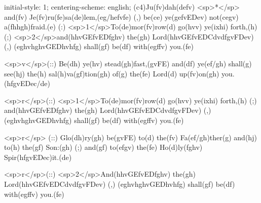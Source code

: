 initial-style: 1;
centering-scheme: english;
(c4)Ju(fv)dah(defv) <sp>*</sp> and(fv) Je(fv)ru(fe)sa(de)lem,(eg/hefvfe) (,) be(ce) ye(gefvEDev) not(cegv) a(fhhgh)fraid.(e) (:) <sp>1</sp>To(de)mor(fv)row(d) go(hvv) ye(ixhi) forth,(h) (;) <sp>2</sp>and(hhvGEfvEDfghv) the(gh) Lord(hhvGEfvEDCdvdfgvFDev) (,) (eghvhghvGEDhvhfg) shall(gf) be(df) with(egffv) you.(fe) 

<sp>v</sp>(::) Be(dh) ye(hv) stead(gh)fast,(gvFE) and(df) ye(ef/gh) shall(g) see(hj) the(h) sal(h)va(gf)tion(gh) of(g) the(fe) Lord(d) up(fv)on(gh) you.(hfgvEDec/de) 

<sp>r</sp>(::) <sp>1</sp>To(de)mor(fv)row(d) go(hvv) ye(ixhi) forth,(h) (;) and(hhvGEfvEDfghv) the(gh) Lord(hhvGEfvEDCdvdfgvFDev) (,) (eghvhghvGEDhvhfg) shall(gf) be(df) with(egffv) you.(fe) 

<sp>r</sp> (::) Glo(dh)ry(gh) be(gvFE) to(d) the(fv) Fa(ef/gh)ther(g) and(hj) to(h) the(gf) Son:(gh) (;) and(gf) to(efgv) the(fe) Ho(d)ly(fghv) Spir(hfgvEDec)it.(de)

<sp>r</sp>(::) <sp>2</sp>And(hhvGEfvEDfghv) the(gh) Lord(hhvGEfvEDCdvdfgvFDev) (,) (eghvhghvGEDhvhfg) shall(gf) be(df) with(egffv) you.(fe) 